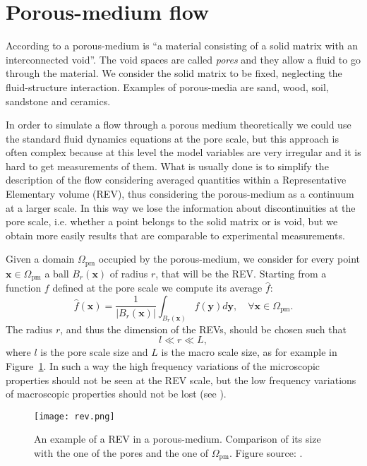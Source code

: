 \section{Porous-medium flow} \label{sec:pm}
According to \cite{forch:nield} a porous-medium is ``a material consisting of a 
solid matrix with an interconnected void''. The void spaces are called 
\emph{pores} and they allow a fluid to go through the material. We consider the 
solid matrix to be fixed, neglecting the fluid-structure interaction. Examples 
of porous-media are sand, wood, soil, 
sandstone and ceramics.

In order to simulate a flow through a porous medium theoretically we could use 
the standard fluid dynamics equations at the pore scale, but this approach is 
often complex because at this level the model variables are very irregular and 
it is hard to get measurements of them. What is usually done is to 
simplify the description of the flow considering averaged quantities within a 
Representative Elementary volume (REV), thus considering the 
porous-medium as a continuum at a larger scale. In this way we lose the 
information about discontinuities at the pore scale, i.e. whether a point 
belongs to the solid matrix or is void, but we obtain more easily results that 
are comparable to experimental measurements.

Given a domain $\Omega_\text{pm}$ occupied by the porous-medium, we consider 
for every point $\mathbf{x} \in \Omega_\text{pm}$ a ball $B_r(\mathbf{x})$ of 
radius $r$, that will be the REV. Starting from a function $f$ defined at the 
pore scale we compute its average $\hat{f}$:
\begin{equation}
	\hat{f}(\mathbf{x}) = \frac{1}{|B_r(\mathbf{x})|} \int_{B_r(\mathbf{x})} 
	f(\mathbf{y}) d\mathbf{y}, \quad \forall \mathbf{x} \in \Omega_\text{pm}.
\end{equation}
The radius $r$, and thus the dimension of the REVs, should be chosen such that
\begin{equation}
	l \ll r \ll L,
\end{equation}
where $l$ is the pore scale size and $L$ is the macro scale size, as for 
example in Figure~\ref{fig:rev}. In such a way 
the high frequency variations of the microscopic properties should not be seen 
at the REV scale, but the low frequency variations of macroscopic properties 
should not be lost (see \cite{main:helmig}).
\begin{figure}
	\centering
	\texttt{[image: rev.png]}
	\caption[REV in a porous-medium]{An example of a REV in a porous-medium. 
	Comparison of its size with the one of the pores and the one of 
	$\Omega_\text{pm}$. Figure source: \cite{forch:nield}.}
	\label{fig:rev}
\end{figure}

